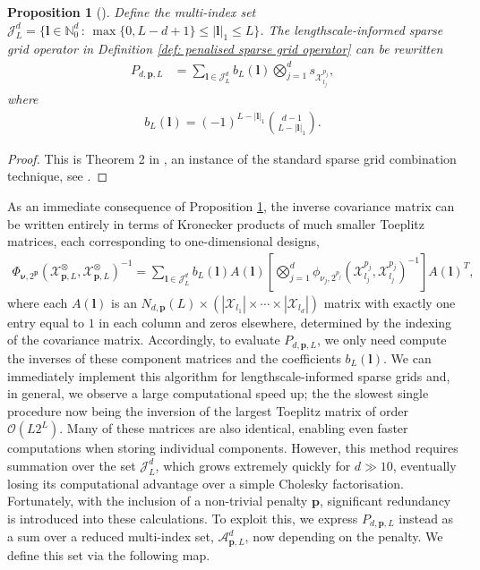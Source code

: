 \documentclass[pdflatex,sn-mathphys-num]{sn-jnl}%
\theoremstyle{thmstyleone}%
\newtheorem{proposition}{Proposition}%
\theoremstyle{thmstyletwo}%
\theoremstyle{thmstylethree}%
\begin{document}
\begin{proposition}[]\label{prop: alt LISG def}
Define the multi-index set \(\mathcal{J}^d_L=\{\boldsymbol{l}\in\mathbb{N}_0^d\,:\,\max\{0,L-d+1\}\leq|\boldsymbol{l}|_1\leq L\}\). The lengthscale-informed sparse grid operator in Definition \ref{def: penalised sparse grid operator} can be rewritten
    \begin{align}
        P_{d,\mathbf{p},L} &= \sum_{\boldsymbol{l}\in \mathcal{J}_L^d}b_{L}(\boldsymbol{l})\bigotimes_{j=1}^ds_{\mathcal{X}^{p_j}_{l_j}},\nonumber
    \end{align}
    where
    \begin{align}
        b_{L}(\boldsymbol{l})=(-1)^{L-|\boldsymbol{l}|_1}\binom{d-1}{L-|\boldsymbol{l}|_1}.\nonumber
    \end{align}
\end{proposition}
\begin{proof}
    This is Theorem 2 in \cite{Plumlee2014}, an instance of the standard sparse grid combination technique, see \cite{pflaum1999,DELVOS198299}.
\end{proof}
As an immediate consequence of Proposition \ref{prop: alt LISG def}, the inverse covariance matrix can be written entirely in terms of Kronecker products of much smaller Toeplitz matrices, each corresponding to one-dimensional designs, 
\begin{align}
    \Phi_{\boldsymbol{\nu},2^{\mathbf{p}}}(\mathcal{X}_{\mathbf{p},L}^{\otimes},\mathcal{X}_{\mathbf{p},L}^{\otimes})^{-1}=\sum_{\boldsymbol{l}\in\mathcal{J}_L^d}b_L(\boldsymbol{l})A(\boldsymbol{l})\left[\bigotimes_{j=1}^d\phi_{\nu_j,2^{p_j}}(\mathcal{X}_{l_j}^{p_j},\mathcal{X}_{l_j}^{p_j})^{-1}\right]A(\boldsymbol{l})^T,\nonumber
\end{align}
where each \(A(\boldsymbol{l})\) is an \(N_{d,\mathbf{p}}(L) \times (|\mathcal{X}_{l_1}|\times\cdots\times|\mathcal{X}_{l_d}|)\) matrix with exactly one entry equal to \(1\) in each column and zeros elsewhere, determined by the indexing of the covariance matrix. Accordingly, to evaluate \(P_{d,\mathbf{p},L}\), we only need compute the inverses of these component matrices and the coefficients \(b_L(\boldsymbol{l})\). We can immediately implement this algorithm for lengthscale-informed sparse grids and, in general, we observe a large computational speed up; the the slowest single procedure now being the inversion of the largest Toeplitz matrix of order \(\mathcal{O}(L2^L)\). Many of these matrices are also identical, enabling even faster computations when storing individual components. However, this method requires summation over the set \(\mathcal{J}_L^d\), which grows extremely quickly for \(d\gg10\), eventually losing its computational advantage over a simple Cholesky factorisation. Fortunately, with the inclusion of a non-trivial penalty \(\mathbf{p}\), significant redundancy is introduced into these calculations. To exploit this, we express \(P_{d,\mathbf{p},L}\) instead as a sum over a reduced multi-index set, \(\mathcal{A}_{\mathbf{p},L}^d\), now depending on the penalty. We define this set via the following map.
\end{document}

